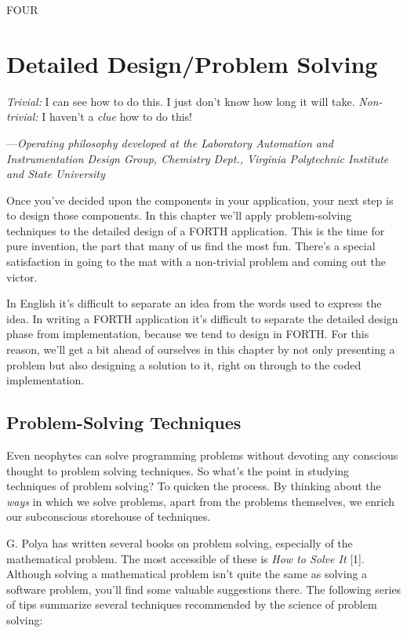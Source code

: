 
FOUR

\chapter{Detailed Design/Problem Solving}

\emph{Trivial:} I can see how to do this. I just don't know how long it
will take.
\emph{Non-trivial:} I haven't a \emph{clue} how to do this!

---\emph{Operating philosophy developed at the Laboratory
Automation and Instrumentation Design Group,
Chemistry Dept., Virginia Polytechnic Institute and State University}

Once you've decided upon the components in your application, your next
step is to design those components. In this chapter we'll apply
problem-solving techniques to the detailed design of a FORTH application.
This is the time for pure invention, the part that many of us find the most
fun. There's a special satisfaction in going to the mat with a non-trivial
problem and coming out the victor.

In English it's difficult to separate an idea from the words used to
express the idea. In writing a FORTH application it's difficult to
separate the detailed design phase from implementation, because we tend
to design in FORTH. For this reason, we'll get a bit ahead of ourselves in
this chapter by not only presenting a problem but also designing a solution
to it, right on through to the coded implementation.

\section{Problem-Solving Techniques}

Even neophytes can solve programming problems without devoting any
conscious thought to problem solving techniques. So what's the point in
studying techniques of problem solving? To quicken the process. By
thinking about the \emph{ways} in which we solve problems, apart from
the problems themselves, we enrich our subconscious storehouse of
techniques.

G. Polya has written several books on problem solving, especially of
the mathematical problem. The most accessible of these is \emph{How to Solve
It} [1]. Although solving a mathematical problem isn't quite the same as
solving a software problem, you'll find some valuable suggestions there.
The following series of tips summarize several techniques recommended by
the science of problem solving:


